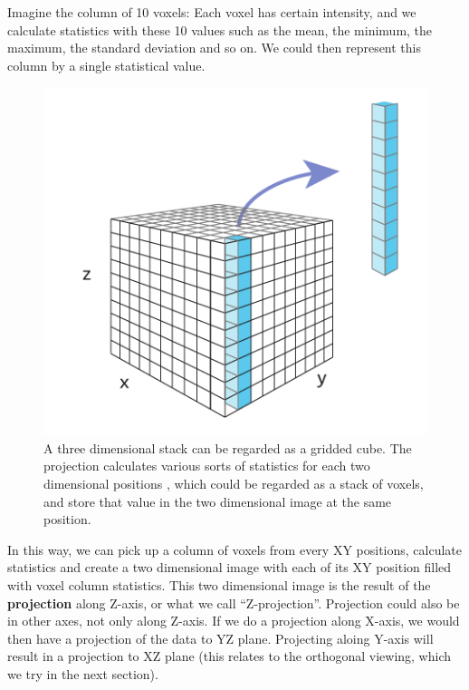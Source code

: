 Imagine the column of 10 voxels: Each voxel has certain intensity, and we calculate statistics with these 10 values such as the mean, the minimum, the maximum, the standard deviation and so on. We could then represent this column by a single statistical value.  

\begin{figure}[h!]
\begin{center}
\includegraphics[scale=0.8]{fig/projection.pdf}
\caption{A three dimensional stack can be regarded as a gridded cube. The projection calculates various sorts of statistics for each two dimensional positions , which could be regarded as a stack of voxels, and store that value in the two dimensional image at the same position.}
\label{fig:projectionscheme}
\end{center}
\end{figure}

In this way, we can pick up a column of voxels from every XY positions, calculate statistics and create a two dimensional image with each of its XY position filled with voxel column statistics. This two dimensional image is the result of the \textbf{projection} along Z-axis, or what we call ``Z-projection''. Projection could also be in other axes, not only along Z-axis. If we do a projection along X-axis, we would then have a projection of the data to YZ plane. Projecting aloing Y-axis will result in a projection to XZ plane (this relates to the orthogonal viewing, which we try in the next section).

